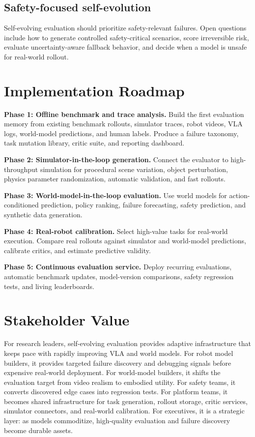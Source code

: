 \documentclass[sigconf,review,anonymous]{acmart}
\begin{document}
\subsection{Safety-focused self-evolution}

Self-evolving evaluation should prioritize safety-relevant failures. Open questions include how to generate controlled safety-critical scenarios, score irreversible risk, evaluate uncertainty-aware fallback behavior, and decide when a model is unsafe for real-world rollout.

\section{Implementation Roadmap}

\textbf{Phase 1: Offline benchmark and trace analysis.} Build the first evaluation memory from existing benchmark rollouts, simulator traces, robot videos, VLA logs, world-model predictions, and human labels. Produce a failure taxonomy, task mutation library, critic suite, and reporting dashboard.

\textbf{Phase 2: Simulator-in-the-loop generation.} Connect the evaluator to high-throughput simulation for procedural scene variation, object perturbation, physics parameter randomization, automatic validation, and fast rollouts.

\textbf{Phase 3: World-model-in-the-loop evaluation.} Use world models for action-conditioned prediction, policy ranking, failure forecasting, safety prediction, and synthetic data generation.

\textbf{Phase 4: Real-robot calibration.} Select high-value tasks for real-world execution. Compare real rollouts against simulator and world-model predictions, calibrate critics, and estimate predictive validity.

\textbf{Phase 5: Continuous evaluation service.} Deploy recurring evaluations, automatic benchmark updates, model-version comparisons, safety regression tests, and living leaderboards.

\section{Stakeholder Value}

For research leaders, self-evolving evaluation provides adaptive infrastructure that keeps pace with rapidly improving VLA and world models. For robot model builders, it provides targeted failure discovery and debugging signals before expensive real-world deployment. For world-model builders, it shifts the evaluation target from video realism to embodied utility. For safety teams, it converts discovered edge cases into regression tests. For platform teams, it becomes shared infrastructure for task generation, rollout storage, critic services, simulator connectors, and real-world calibration. For executives, it is a strategic layer: as models commoditize, high-quality evaluation and failure discovery become durable assets.
\end{document}
